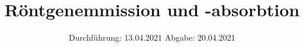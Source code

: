 

\subject{602}
\title{Röntgenemmission und -absorbtion}
\date{%
  Durchführung: 13.04.2021
  \hspace{3em}
  Abgabe: 20.04.2021
}



\maketitle
\thispagestyle{empty}
\tableofcontents
\newpage







\printbibliography{}



